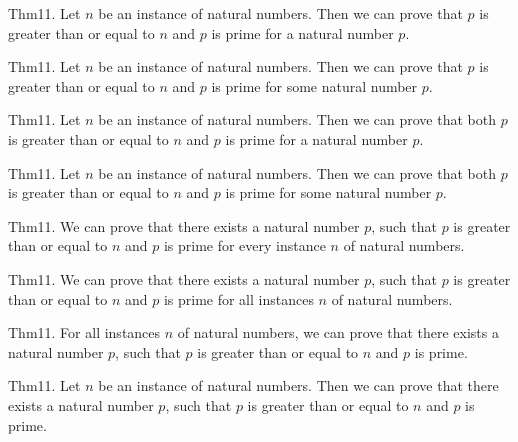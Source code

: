 \documentclass{article}
\begin{document}
Thm11. Let $n$ be an instance of natural numbers. Then we can prove that $p$ is greater than or equal to $n$ and $p$ is prime for a natural number $p$.

Thm11. Let $n$ be an instance of natural numbers. Then we can prove that $p$ is greater than or equal to $n$ and $p$ is prime for some natural number $p$.

Thm11. Let $n$ be an instance of natural numbers. Then we can prove that both $p$ is greater than or equal to $n$ and $p$ is prime for a natural number $p$.

Thm11. Let $n$ be an instance of natural numbers. Then we can prove that both $p$ is greater than or equal to $n$ and $p$ is prime for some natural number $p$.

Thm11. We can prove that there exists a natural number $p$, such that $p$ is greater than or equal to $n$ and $p$ is prime for every instance $n$ of natural numbers.

Thm11. We can prove that there exists a natural number $p$, such that $p$ is greater than or equal to $n$ and $p$ is prime for all instances $n$ of natural numbers.

Thm11. For all instances $n$ of natural numbers, we can prove that there exists a natural number $p$, such that $p$ is greater than or equal to $n$ and $p$ is prime.

Thm11. Let $n$ be an instance of natural numbers. Then we can prove that there exists a natural number $p$, such that $p$ is greater than or equal to $n$ and $p$ is prime.
\end{document}

